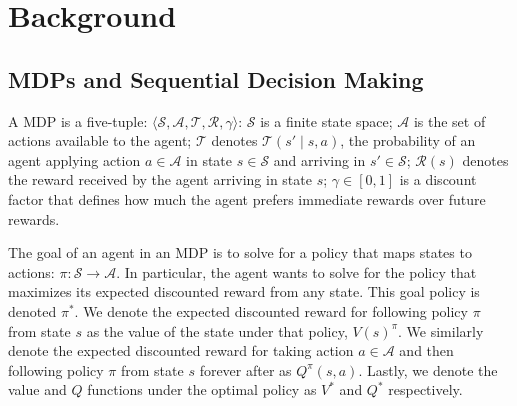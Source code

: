 \documentclass{article}
\begin{document}

\section{Background}

\subsection{\acp{MDP} and Sequential Decision Making}
A \ac{MDP} is a five-tuple: $\langle \mathcal{S}, \mathcal{A}, \mathcal{T}, \mathcal{R}, \gamma \rangle$: $\mathcal{S}$ is a finite state space; $\mathcal{A}$ is the set of actions available to the agent; $\mathcal{T}$ denotes $\mathcal{T}(s' \mid s,a)$, the probability of an agent applying action $a \in \mathcal{A}$ in state $s \in \mathcal{S}$ and arriving in $s' \in \mathcal{S}$; $\mathcal{R}(s)$ denotes the reward received by the agent arriving in state $s$; $\gamma \in [0, 1]$ is a discount  factor that defines how much the agent prefers immediate rewards over future rewards.

The goal of an agent in an \ac{MDP} is to solve for a policy that maps states to actions: $\pi: \mathcal{S} \rightarrow \mathcal{A}$. In particular, the agent wants to solve for the policy that maximizes its expected discounted reward from any state. This goal policy is denoted $\pi^*$. We denote the expected discounted reward for following policy $\pi$ from state $s$ as the value of the state under that policy, $V(s)^\pi$. We similarly denote the expected discounted reward for taking action $a \in \mathcal{A}$ and then following policy $\pi$ from state $s$ forever after as $Q^\pi(s,a)$. Lastly, we denote the value and $Q$ functions under the optimal policy as $V^*$ and $Q^*$ respectively.
\end{document}
